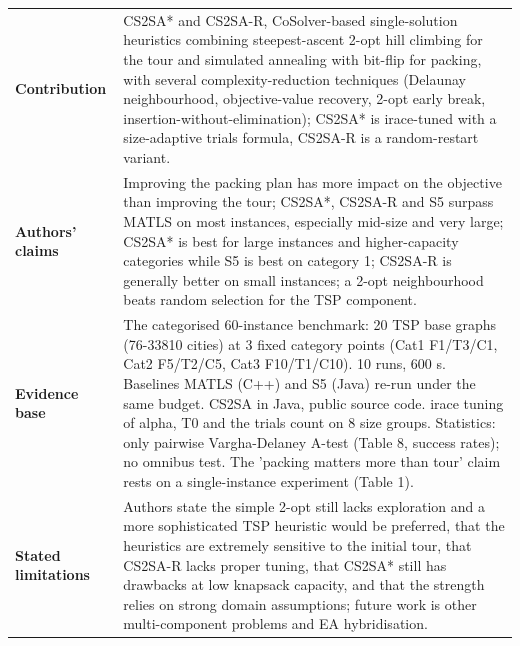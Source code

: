 \documentclass[
  a4paper,
  11pt,
  headings=small,
  numbers=noenddot,
  abstract=on,
  parskip=half,
]{scrartcl}
\begin{document}
\begin{landscape}
\begin{longtable}{@{}p{2.6cm}p{8.7cm}p{2.6cm}p{8.7cm}@{}}
\textbf{Contribution} & \multicolumn{3}{p{20.0cm}}{CS2SA* and CS2SA-R, CoSolver-based single-solution heuristics combining steepest-ascent 2-opt hill climbing for the tour and simulated annealing with bit-flip for packing, with several complexity-reduction techniques (Delaunay neighbourhood, objective-value recovery, 2-opt early break, insertion-without-elimination); CS2SA* is irace-tuned with a size-adaptive trials formula, CS2SA-R is a random-restart variant.} \\
\textbf{Authors' claims} & \multicolumn{3}{p{20.0cm}}{Improving the packing plan has more impact on the objective than improving the tour; CS2SA*, CS2SA-R and S5 surpass MATLS on most instances, especially mid-size and very large; CS2SA* is best for large instances and higher-capacity categories while S5 is best on category 1; CS2SA-R is generally better on small instances; a 2-opt neighbourhood beats random selection for the TSP component.} \\
\textbf{Evidence base} & \multicolumn{3}{p{20.0cm}}{The categorised 60-instance benchmark: 20 TSP base graphs (76-33810 cities) at 3 fixed category points (Cat1 F1/T3/C1, Cat2 F5/T2/C5, Cat3 F10/T1/C10). 10 runs, 600 s. Baselines MATLS (C++) and S5 (Java) re-run under the same budget. CS2SA in Java, public source code. irace tuning of alpha, T0 and the trials count on 8 size groups. Statistics: only pairwise Vargha-Delaney A-test (Table 8, success rates); no omnibus test. The 'packing matters more than tour' claim rests on a single-instance experiment (Table 1).} \\
\textbf{Stated limitations} & \multicolumn{3}{p{20.0cm}}{Authors state the simple 2-opt still lacks exploration and a more sophisticated TSP heuristic would be preferred, that the heuristics are extremely sensitive to the initial tour, that CS2SA-R lacks proper tuning, that CS2SA* still has drawbacks at low knapsack capacity, and that the strength relies on strong domain assumptions; future work is other multi-component problems and EA hybridisation.} \\

\end{longtable}
\end{landscape}
\end{document}
